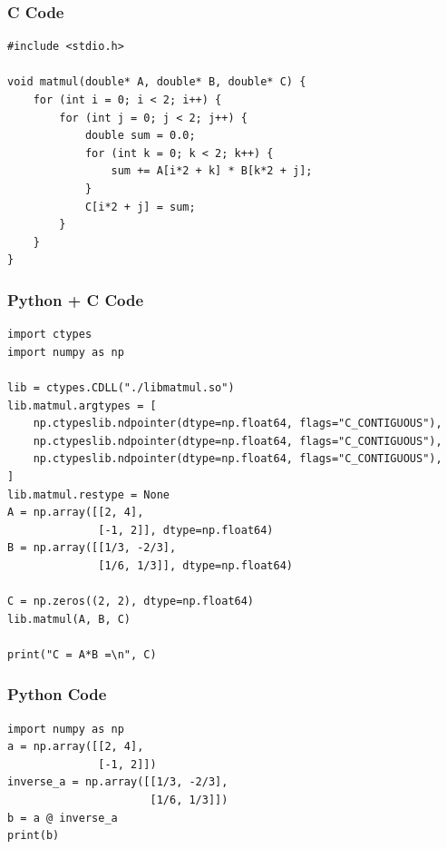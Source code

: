 \documentclass{beamer}
\begin{document}
\begin{frame}[fragile]
    \frametitle{C Code}
    \begin{lstlisting}
#include <stdio.h>

void matmul(double* A, double* B, double* C) {
    for (int i = 0; i < 2; i++) {
        for (int j = 0; j < 2; j++) {
            double sum = 0.0;
            for (int k = 0; k < 2; k++) {
                sum += A[i*2 + k] * B[k*2 + j];
            }
            C[i*2 + j] = sum;
        }
    }
}
    \end{lstlisting}
\end{frame}

\begin{frame}[fragile]
    \frametitle{Python + C Code}
    \begin{lstlisting}
import ctypes
import numpy as np

lib = ctypes.CDLL("./libmatmul.so")
lib.matmul.argtypes = [
    np.ctypeslib.ndpointer(dtype=np.float64, flags="C_CONTIGUOUS"), 
    np.ctypeslib.ndpointer(dtype=np.float64, flags="C_CONTIGUOUS"),
    np.ctypeslib.ndpointer(dtype=np.float64, flags="C_CONTIGUOUS"), 
]
lib.matmul.restype = None
A = np.array([[2, 4],
              [-1, 2]], dtype=np.float64)
B = np.array([[1/3, -2/3],
              [1/6, 1/3]], dtype=np.float64)

C = np.zeros((2, 2), dtype=np.float64)
lib.matmul(A, B, C)

print("C = A*B =\n", C)

    \end{lstlisting}
\end{frame}

\begin{frame}[fragile]
    \frametitle{Python Code}
    \begin{lstlisting}
import numpy as np
a = np.array([[2, 4],
              [-1, 2]])
inverse_a = np.array([[1/3, -2/3],
                      [1/6, 1/3]])
b = a @ inverse_a
print(b)

    \end{lstlisting}
\end{frame}
\end{document}
